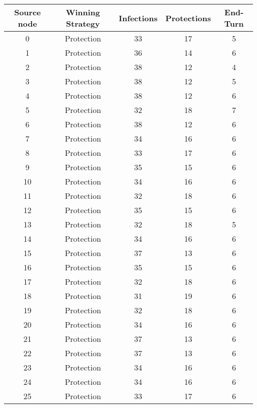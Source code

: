 \documentclass[results.tex]{subfiles}
\begin{document}
\begin{center}
  \begin{tabular}{| c || c | c | c | c |}
    \hline
    {\bfseries Source node} & {\bfseries Winning Strategy} & {\bfseries Infections} & {\bfseries Protections} & {\bfseries End-Turn} \\  %
    \hline\hline
    0 & Protection & 33 & 17 & 5 \\ 
    \hline
    1 & Protection & 36 & 14 & 6 \\ 
    \hline
    2 & Protection & 38 & 12 & 4 \\ 
    \hline
    3 & Protection & 38 & 12 & 5 \\ 
    \hline
    4 & Protection & 38 & 12 & 6 \\ 
    \hline
    5 & Protection & 32 & 18 & 7 \\ 
    \hline
    6 & Protection & 38 & 12 & 6 \\ 
    \hline
    7 & Protection & 34 & 16 & 6 \\ 
    \hline
    8 & Protection & 33 & 17 & 6 \\ 
    \hline
    9 & Protection & 35 & 15 & 6 \\ 
    \hline
    10 & Protection & 34 & 16 & 6 \\ 
    \hline
    11 & Protection & 32 & 18 & 6 \\ 
    \hline
    12 & Protection & 35 & 15 & 6 \\ 
    \hline
    13 & Protection & 32 & 18 & 5 \\ 
    \hline
    14 & Protection & 34 & 16 & 6 \\ 
    \hline
    15 & Protection & 37 & 13 & 6 \\ 
    \hline
    16 & Protection & 35 & 15 & 6 \\ 
    \hline
    17 & Protection & 32 & 18 & 6 \\ 
    \hline
    18 & Protection & 31 & 19 & 6 \\ 
    \hline
    19 & Protection & 32 & 18 & 6 \\ 
    \hline
    20 & Protection & 34 & 16 & 6 \\ 
    \hline
    21 & Protection & 37 & 13 & 6 \\ 
    \hline
    22 & Protection & 37 & 13 & 6 \\ 
    \hline
    23 & Protection & 34 & 16 & 6 \\ 
    \hline
    24 & Protection & 34 & 16 & 6 \\ 
    \hline
    25 & Protection & 33 & 17 & 6 \\ 

\end{tabular}
\end{center}
\end{document}
